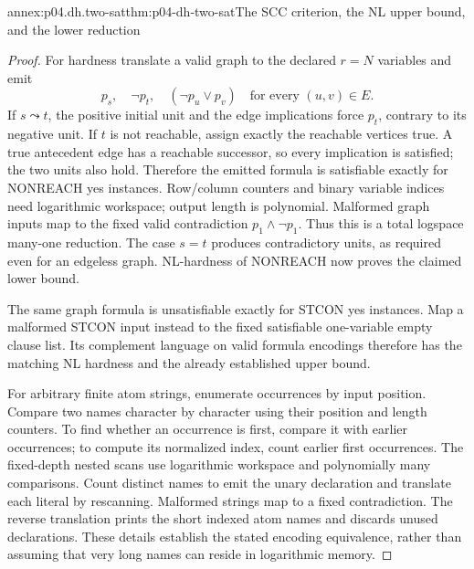 \begin{annexitem}{annex:p04.dh.two-sat}{thm:p04-dh-two-sat}{The SCC criterion, the NL upper bound, and the lower reduction}
\begin{proof}
For hardness translate a valid graph to the declared \(r=N\) variables
and emit
\[
 p_s,\quad \neg p_t,\quad
 (\neg p_u\lor p_v)\quad\text{for every }(u,v)\in E.
\]
If \(s\leadsto t\), the positive initial unit and the edge implications
force \(p_t\), contrary to its negative unit. If \(t\) is not reachable,
assign exactly the reachable vertices true. A true antecedent edge has
a reachable successor, so every implication is satisfied; the two
units also hold. Therefore the emitted formula is satisfiable exactly
for NONREACH yes instances. Row/column counters and binary variable
indices need logarithmic workspace; output length is polynomial.
Malformed graph inputs map to the fixed valid contradiction
\(p_1\land\neg p_1\). Thus this is a total logspace many-one reduction.
The case \(s=t\) produces contradictory units, as required even for
an edgeless graph. NL-hardness of NONREACH now proves the claimed lower
bound.

The same graph formula is unsatisfiable exactly for STCON yes instances.
Map a malformed STCON input instead to the fixed satisfiable one-variable
empty clause list. Its complement language on valid formula encodings
therefore has the matching NL hardness and the already established
upper bound.

For arbitrary finite atom strings, enumerate occurrences by input
position. Compare two names character by character using their position
and length counters. To find whether an occurrence is first, compare
it with earlier occurrences; to compute its normalized index, count
earlier first occurrences. The fixed-depth nested scans use logarithmic
workspace and polynomially many comparisons. Count distinct names to
emit the unary declaration and translate each literal by rescanning.
Malformed strings map to a fixed contradiction. The reverse translation
prints the short indexed atom names and discards unused declarations.
These details establish the stated encoding equivalence, rather than
assuming that very long names can reside in logarithmic memory.
\end{proof}
\end{annexitem}

